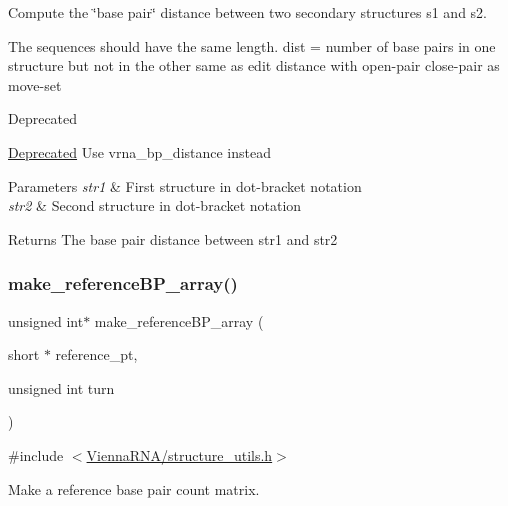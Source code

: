 Compute the \char`\"{}base pair\char`\"{} distance between two secondary structures s1 and s2. 

The sequences should have the same length. dist = number of base pairs in one structure but not in the other same as edit distance with open-\/pair close-\/pair as move-\/set

\begin{DoxyRefDesc}{Deprecated}
\item[\hyperlink{deprecated__deprecated000143}{Deprecated}]Use vrna\+\_\+bp\+\_\+distance instead \end{DoxyRefDesc}

\begin{DoxyParams}{Parameters}
{\em str1} & First structure in dot-\/bracket notation \\
\hline
{\em str2} & Second structure in dot-\/bracket notation \\
\hline
\end{DoxyParams}
\begin{DoxyReturn}{Returns}
The base pair distance between str1 and str2 
\end{DoxyReturn}
\mbox{\label{group__struct__utils_ga578cd9712dee812fb1c58aa3cc489864}} 
\subsubsection{\texorpdfstring{make\+\_\+reference\+B\+P\+\_\+array()}{make\_referenceBP\_array()}}
{\footnotesize\ttfamily unsigned int$\ast$ make\+\_\+reference\+B\+P\+\_\+array (\begin{DoxyParamCaption}\item[{short $\ast$}]{reference\+\_\+pt,  }\item[{unsigned int}]{turn }\end{DoxyParamCaption})}



{\ttfamily \#include $<$\hyperlink{structure__utils_8h}{Vienna\+R\+N\+A/structure\+\_\+utils.\+h}$>$}



Make a reference base pair count matrix. 

